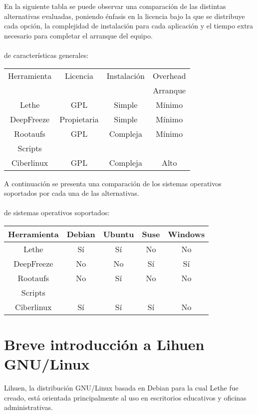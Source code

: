 \documentclass[final,narroweqnarray,inline,twoside]{ieee}
\begin{document}
En la siguiente tabla se puede observar una comparación de las distintas alternativas evaluadas, poniendo énfasis en la licencia bajo la que se distribuye cada opción, la complejidad de instalación para cada aplicación y el tiempo extra necesario para completar el arranque del equipo.
\\
\\
\tablename{ de características generales:}
\begin{center}\begin{tabular}{|c|c|c|c|}
\hline
 Herramienta & Licencia & Instalación & Overhead\\ & & & Arranque\\
\hline
Lethe &  GPL & Simple & Mínimo\\
\hline
DeepFreeze &  Propietaria &  Simple & Mínimo\\
\hline
Rootaufs &  GPL &  Compleja & Mínimo\\
\hline
Scripts & & & \\  Ciberlinux &  GPL &  Compleja & Alto\\
\hline
\end{tabular}\end{center}
A continuación se presenta una comparación de los sistemas operativos soportados por cada una de las alternativas.
\\
\\
\tablename{ de sistemas operativos soportados:}
\begin{center}\begin{tabular}{|c|c|c|c|c|}
\hline
 Herramienta & Debian & Ubuntu & Suse & Windows\\
\hline
Lethe &  Sí & Sí & No & No\\
\hline
DeepFreeze &  No & No & Sí & Sí \\
\hline
Rootaufs &  No &  Sí & No & No\\
\hline
Scripts & & & &\\  Ciberlinux & Sí & Sí & Sí & No\\
\hline
\end{tabular}\end{center}

\section{Breve introducción a Lihuen GNU/Linux}
Lihuen, la distribución GNU/Linux basada en Debian para la cual Lethe fue creado, está orientada principalmente al uso en escritorios educativos y oficinas administrativas. 
\end{document}
